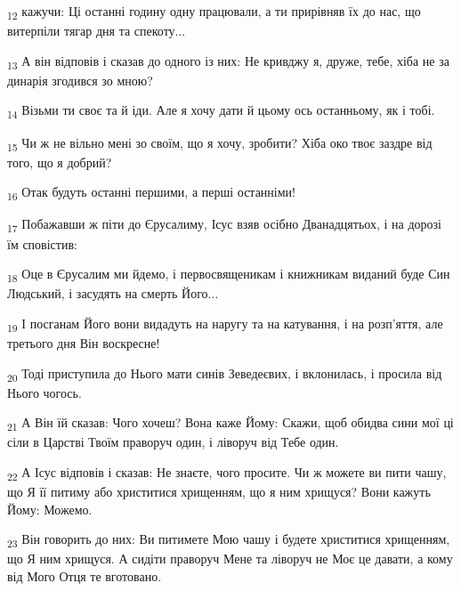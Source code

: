\begin{tcolorbox}
\textsubscript{12} кажучи: Ці останні годину одну працювали, а ти прирівняв їх до нас, що витерпіли тягар дня та спекоту...
\end{tcolorbox}
\begin{tcolorbox}
\textsubscript{13} А він відповів і сказав до одного із них: Не кривджу я, друже, тебе, хіба не за динарія згодився зо мною?
\end{tcolorbox}
\begin{tcolorbox}
\textsubscript{14} Візьми ти своє та й іди. Але я хочу дати й цьому ось останньому, як і тобі.
\end{tcolorbox}
\begin{tcolorbox}
\textsubscript{15} Чи ж не вільно мені зо своїм, що я хочу, зробити? Хіба око твоє заздре від того, що я добрий?
\end{tcolorbox}
\begin{tcolorbox}
\textsubscript{16} Отак будуть останні першими, а перші останніми!
\end{tcolorbox}
\begin{tcolorbox}
\textsubscript{17} Побажавши ж піти до Єрусалиму, Ісус взяв осібно Дванадцятьох, і на дорозі їм сповістив:
\end{tcolorbox}
\begin{tcolorbox}
\textsubscript{18} Оце в Єрусалим ми йдемо, і первосвященикам і книжникам виданий буде Син Людський, і засудять на смерть Його...
\end{tcolorbox}
\begin{tcolorbox}
\textsubscript{19} І посганам Його вони видадуть на наругу та на катування, і на розп'яття, але третього дня Він воскресне!
\end{tcolorbox}
\begin{tcolorbox}
\textsubscript{20} Тоді приступила до Нього мати синів Зеведеєвих, і вклонилась, і просила від Нього чогось.
\end{tcolorbox}
\begin{tcolorbox}
\textsubscript{21} А Він їй сказав: Чого хочеш? Вона каже Йому: Скажи, щоб обидва сини мої ці сіли в Царстві Твоїм праворуч один, і ліворуч від Тебе один.
\end{tcolorbox}
\begin{tcolorbox}
\textsubscript{22} А Ісус відповів і сказав: Не знаєте, чого просите. Чи ж можете ви пити чашу, що Я її питиму або христитися хрищенням, що я ним хрищуся? Вони кажуть Йому: Можемо.
\end{tcolorbox}
\begin{tcolorbox}
\textsubscript{23} Він говорить до них: Ви питимете Мою чашу і будете христитися хрищенням, що Я ним хрищуся. А сидіти праворуч Мене та ліворуч не Моє це давати, а кому від Мого Отця те вготовано.
\end{tcolorbox}
